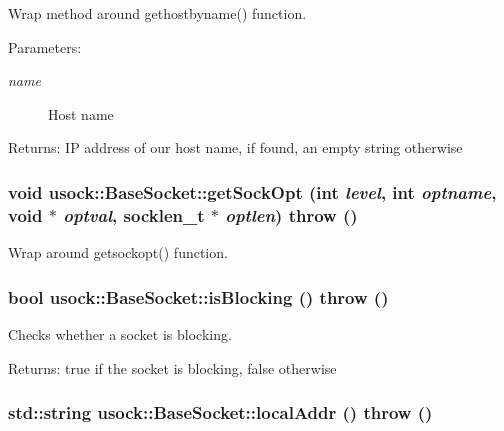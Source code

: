 Wrap method around gethostbyname() function. 

\begin{Desc}
\item[Parameters:]
\begin{description}
\item[{\em name}]Host name \end{description}
\end{Desc}
\begin{Desc}
\item[Returns:]IP address of our host name, if found, an empty string otherwise \end{Desc}
\hypertarget{classusock_1_1BaseSocket_87925e8c3b89a50f8c8c2a68e0d2ab70}{
\subsubsection[{getSockOpt}]{\setlength{\rightskip}{0pt plus 5cm}void usock::BaseSocket::getSockOpt (int {\em level}, \/  int {\em optname}, \/  void $\ast$ {\em optval}, \/  socklen\_\-t $\ast$ {\em optlen})  throw ()}}
\label{classusock_1_1BaseSocket_87925e8c3b89a50f8c8c2a68e0d2ab70}


Wrap around getsockopt() function. 

\hypertarget{classusock_1_1BaseSocket_d29a1fabc8b4c7a86cd236473ef03177}{
\subsubsection[{isBlocking}]{\setlength{\rightskip}{0pt plus 5cm}bool usock::BaseSocket::isBlocking ()  throw ()}}
\label{classusock_1_1BaseSocket_d29a1fabc8b4c7a86cd236473ef03177}


Checks whether a socket is blocking. 

\begin{Desc}
\item[Returns:]true if the socket is blocking, false otherwise \end{Desc}
\hypertarget{classusock_1_1BaseSocket_479da55516dcda8117a356d8a3be3d83}{
\subsubsection[{localAddr}]{\setlength{\rightskip}{0pt plus 5cm}std::string usock::BaseSocket::localAddr ()  throw ()}}
\label{classusock_1_1BaseSocket_479da55516dcda8117a356d8a3be3d83}


